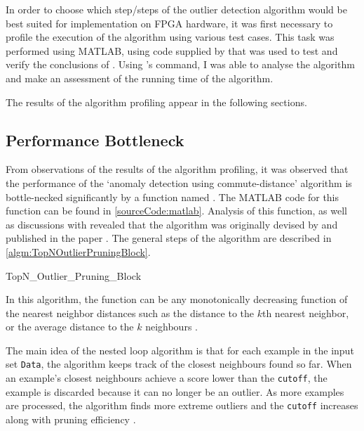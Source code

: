 In order to choose which step/steps of the outlier detection algorithm would be
best suited for implementation on FPGA hardware, it was first necessary to
profile the execution of the algorithm using various test cases. This task was
performed using MATLAB, using code supplied by \citeauthor{Khoa:2012} that was
used to test and verify the conclusions of . Using
's  command, I was able to analyse the
algorithm and make an assessment of the running time of the algorithm.

The results of the algorithm profiling appear in the following sections.

\subsection{Performance Bottleneck}
\label{algorithmPerformance:bottleneck}
From observations of the results of the algorithm profiling, it was observed
that the performance of the `anomaly detection using commute-distance' algorithm
is bottle-necked significantly by a function named
. The MATLAB code for this function can be
found in \autoref{sourceCode:matlab}. Analysis of this function, as well as
discussions with \citeauthor{Khoa:2012} revealed that the algorithm was
originally devised by \citeauthor{Bay:2003} and published in the paper
. The general steps of the algorithm are described in
\autoref{algm:TopNOutlierPruningBlock}.

\begin{algorithm}
    
    \caption{TopN\_Outlier\_Pruning\_Block}
    \label{algm:TopNOutlierPruningBlock}
\end{algorithm}

In this algorithm, the  function can be any monotonically
decreasing function of the nearest neighbor distances such as the distance to
the $k$th nearest neighbor, or the average distance to the $k$ neighbours
\cite{Bay:2003}.

The main idea of the nested loop algorithm is that for each example in the
input set \verb+Data+, the algorithm keeps track of the closest neighbours found
so far. When an example's closest neighbours achieve a score lower than the
\verb+cutoff+, the example is discarded because it can no longer be an outlier.
As more examples are processed, the algorithm finds more extreme outliers and
the \verb+cutoff+ increases along with pruning efficiency \cite{Bay:2003}.

